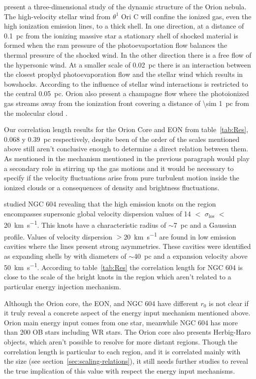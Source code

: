 \documentclass[fleqn,usenatbib, useAMS, a4paper]{mnras}
\begin{document}
\citet{2009AJ....137..367O} present a three-dimensional study of the dynamic structure of the Orion nebula.
The high-velocity stellar wind from \(\theta^1\) Ori C will confine the ionized gas, even the high ionization emission lines, to a thick shell.
In one direction, at a distance of \SI{0.1}{pc} from the ionizing massive star a stationary shell of shocked material is formed when the ram pressure of the photoevaportation flow balances the thermal pressure of the shocked wind.
In the other direction there is a free flow of the hypersonic wind.
At a smaller scale of \SI{0.02}{pc} there is an interaction between the closest proplyd photoevaporation flow and the stellar wind which results in bowshocks.
According to \citet{2001ApJ...561..830G} the influence of stellar wind interactions is restricted to the central \SI{0.05}{pc}. 
Orion also present a champagne flow where the photoionized gas streams away from the ionization front covering a distance of \SI{\sim 1}{pc} from the molecular cloud \citep{1973ApJ...183..863Z}.

Our correlation length results for the Orion Core and EON from table~\ref{tab:Res}, \num{0.068} y \SI{0.39}{pc} respectively, despite been of the order of the scales mentioned above still aren't conclusive enough to determine a direct relation between them.
As mentioned in \citet{arthur2016turbulence} the mechanism mentioned in the previous paragraph would play a secondary role in stirring up the gas motions and it would be necessary to specify if the velocity fluctuations arise from pure turbulent motion inside the ionized clouds or a consequences of density and brightness fluctuations.

\citet{sabalisck1995supersonic} studied NGC 604 revealing that the high emission knots on the region encompasses supersonic global velocity dispersion values of 14 $<$ \(\sigma_{\text{los}}\) $<$ \SI{20}{km.s^{-1}}.
This knots have a characteristic radius of \(\sim\)\SI{7}{pc} and a Gaussian profile.
Values of velocity dispersion $>$\SI{20}{km.s^{-1}} are found in low emission cavities where the lines present strong asymmetries.
These cavities were identified as expanding shells by \cite{yang1996} with diameters of \(\sim\)\SI{40}{pc} and a expansion velocity above \SI{50}{km.s^{-1}}.
According to table~\ref{tab:Res} the correlation length for NGC 604 is close to the scale of the bright knots in the region which aren't related to a particular energy injection mechanism.

Although the Orion core, the EON, and NGC 604 have different \(r_0\) is not clear if it truly reveal a concrete aspect of the energy input mechanism mentioned above.
Orion main energy input comes from one star, meanwhile NGC 604 has more than 200 OB stars including WR stars. 
The Orion core also presents Herbig-Haro objects, which aren't possible to resolve for more distant regions.
Though the correlation length is particular to each region, and it is correlated mainly with the size (see section~\ref{sec:scaling-relations}), it still needs further studies to reveal the true implication of this value with respect the energy input mechanisms.
\end{document}
